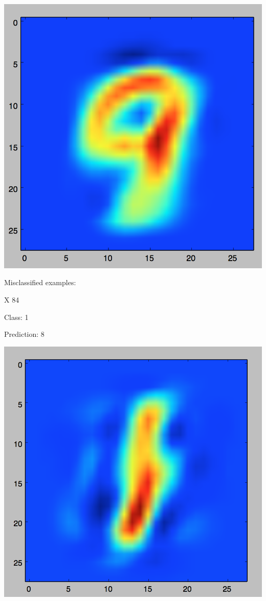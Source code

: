 \documentclass[11pt]{article}
\begin{document}
\includegraphics[scale=.3]{images/bayes9.png}

Misclassified examples:

X 84

Class: 1

Prediction: 8

\includegraphics[scale=.3]{images/bayes_1_8.png}
\end{document}
